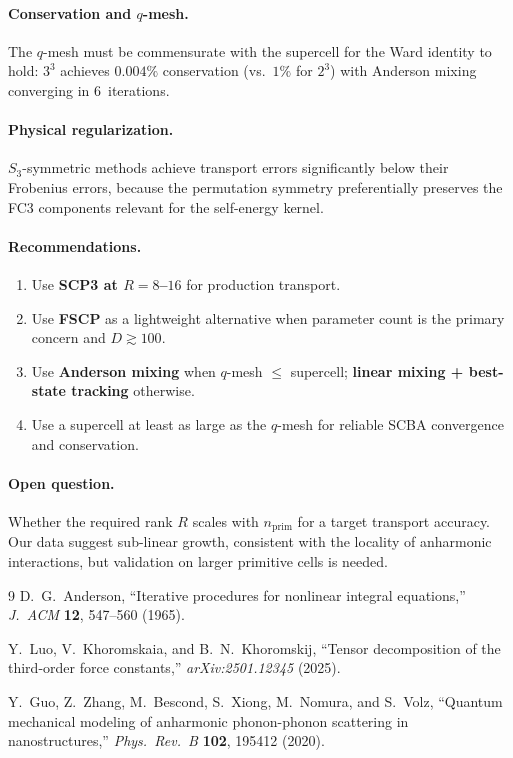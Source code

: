 \documentclass[11pt]{article}
\newcommand{\nprim}{n_{\mathrm{prim}}}
\begin{document}
\paragraph{Conservation and $q$-mesh.}
The $q$-mesh must be commensurate with the supercell for the Ward
identity to hold: $3^3$ achieves $0.004\%$ conservation
(vs.\ $1\%$ for $2^3$) with Anderson mixing converging in
6~iterations.

\paragraph{Physical regularization.}
$S_3$-symmetric methods achieve transport errors significantly below
their Frobenius errors, because the permutation symmetry
preferentially preserves the FC3 components relevant for the
self-energy kernel.

\paragraph{Recommendations.}
\begin{enumerate}
  \item Use \textbf{SCP3 at $R = 8$--$16$} for production transport.
  \item Use \textbf{FSCP} as a lightweight alternative when parameter
        count is the primary concern and $D \gtrsim 100$.
  \item Use \textbf{Anderson mixing} when $q$-mesh $\leq$ supercell;
        \textbf{linear mixing + best-state tracking} otherwise.
  \item Use a supercell at least as large as the $q$-mesh for
        reliable SCBA convergence and conservation.
\end{enumerate}

\paragraph{Open question.}
Whether the required rank $R$ scales with $\nprim$ for a target
transport accuracy.  Our data suggest sub-linear growth, consistent
with the locality of anharmonic interactions, but validation on
larger primitive cells is needed.

\begin{thebibliography}{9}
D.~G.~Anderson,
``Iterative procedures for nonlinear integral equations,''
\emph{J.~ACM} \textbf{12}, 547--560 (1965).

Y.~Luo, V.~Khoromskaia, and B.~N.~Khoromskij,
``Tensor decomposition of the third-order force constants,''
\emph{arXiv:2501.12345} (2025).

Y.~Guo, Z.~Zhang, M.~Bescond, S.~Xiong, M.~Nomura, and S.~Volz,
``Quantum mechanical modeling of anharmonic phonon-phonon scattering
in nanostructures,''
\emph{Phys.\ Rev.\ B} \textbf{102}, 195412 (2020).
\end{thebibliography}
\end{document}
